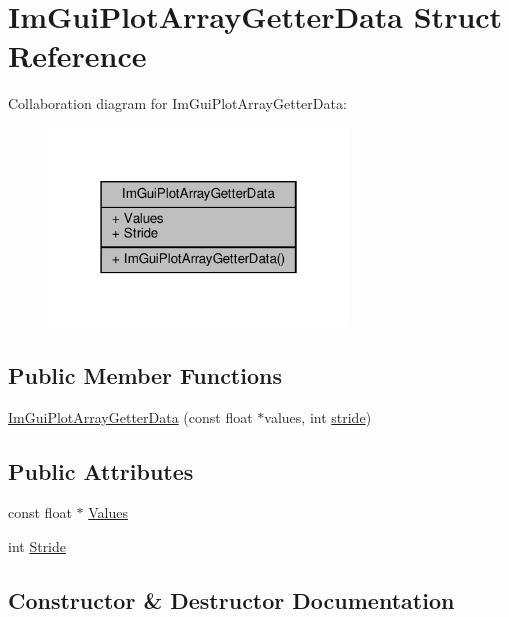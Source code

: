 \hypertarget{structImGuiPlotArrayGetterData}{}\section{Im\+Gui\+Plot\+Array\+Getter\+Data Struct Reference}
\label{structImGuiPlotArrayGetterData}


Collaboration diagram for Im\+Gui\+Plot\+Array\+Getter\+Data\+:
\nopagebreak
\begin{figure}[H]
\begin{center}
\leavevmode
\includegraphics[width=226pt]{structImGuiPlotArrayGetterData__coll__graph}
\end{center}
\end{figure}
\subsection*{Public Member Functions}
\begin{DoxyCompactItemize}
\item 
\hyperlink{structImGuiPlotArrayGetterData_a9c4037621f1c247957c04dc8ae1f2903}{Im\+Gui\+Plot\+Array\+Getter\+Data} (const float $\ast$values, int \hyperlink{imgui__impl__opengl3__loader_8h_adec60f1216ca1b900f8d776c5b6190e0}{stride})
\end{DoxyCompactItemize}
\subsection*{Public Attributes}
\begin{DoxyCompactItemize}
\item 
const float $\ast$ \hyperlink{structImGuiPlotArrayGetterData_aa40ff2e945549744fc622891089ae0fd}{Values}
\item 
int \hyperlink{structImGuiPlotArrayGetterData_aecb2cce4ea91d95ec81937de656cfcd6}{Stride}
\end{DoxyCompactItemize}


\subsection{Constructor \& Destructor Documentation}
\mbox{\label{structImGuiPlotArrayGetterData_a9c4037621f1c247957c04dc8ae1f2903}} 
